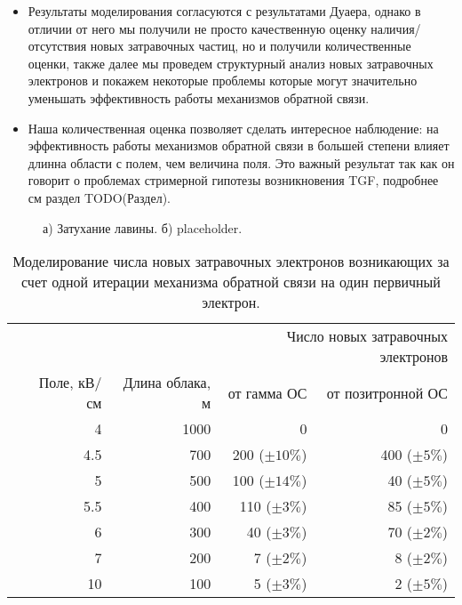 \begin{itemize}
	\item Результаты моделирования согласуются с результатами Дуаера, однако в отличии от него мы получили не просто качественную оценку наличия/отсутствия новых затравочных частиц, но и получили количественные оценки, также далее мы проведем структурный анализ новых затравочных электронов и покажем некоторые проблемы которые могут значительно уменьшать эффективность работы механизмов обратной связи.
	\item Наша количественная оценка позволяет сделать интересное наблюдение: на эффективность работы механизмов обратной связи в большей степени влияет длинна области с полем, чем величина поля. Это важный результат так как он говорит о проблемах стримерной гипотезы возникновения TGF, подробнее см раздел TODO(Раздел). 
\end{itemize}

\begin{figure}[t]
    \begin{center}
        \begin{minipage}[h]{0.49\linewidth}
        \end{minipage}
        \hfill
        \begin{minipage}[h]{0.49\linewidth}
        \end{minipage}
        \caption{а) Затухание лавины. б) placeholder.}
    \end{center}
    \label{fig:storm:dwyer2003}
\end{figure}

\begin{table}[h]
    \centering
    \begin{tabular}{crrrr}
        \hline
        & & & \multicolumn{2}{r}{Число новых затравочных электронов} \\
        & Поле, кВ/см &  Длина облака, м  & от гамма ОС & от позитронной ОС \\
        \hline
        & 4   &  1000&  0 & 0  \\
        & 4.5 &  700 &  200 ($\pm 10 \%$)& 400 ($\pm 5 \%$) \\
        & 5   &  500 &  100 ($\pm 14 \%$)& 40 ($\pm 5 \%$) \\
        & 5.5 &  400 &  110 ($\pm 3 \%$)& 85 ($\pm 5 \%$) \\
        & 6   &  300 &  40 ($\pm 3 \%$)& 70 ($\pm 2 \%$) \\
        & 7   &  200 &  7 ($\pm 2 \%$)& 8 ($\pm 2 \%$) \\
        & 10  &  100 &  5 ($\pm 3 \%$)& 2 ($\pm 5 \%$) \\
        \hline
    \end{tabular}
    \caption{Моделирование числа новых затравочных электронов возникающих за счет одной итерации механизма обратной связи на один первичный электрон.}
    \label{tab:storm:dwyer}
\end{table}

